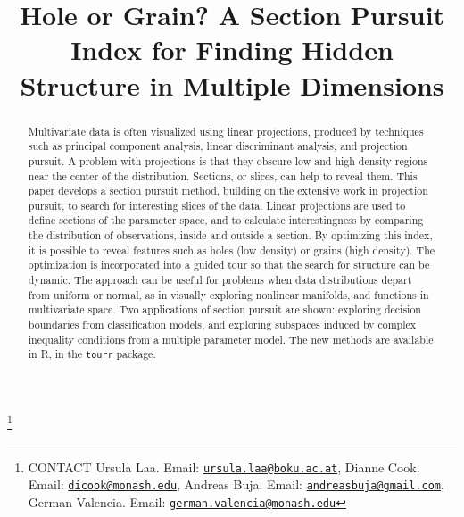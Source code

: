 \documentclass[]{interact}
\theoremstyle{plain}%
\theoremstyle{definition}
\theoremstyle{remark}
\begin{document}
\articletype{}

\title{Hole or Grain? A Section Pursuit Index for Finding Hidden
Structure in Multiple Dimensions}


\author{
}

\thanks{CONTACT Ursula
Laa. Email: \href{mailto:ursula.laa@boku.ac.at}{\nolinkurl{ursula.laa@boku.ac.at}}, Dianne
Cook. Email: \href{mailto:dicook@monash.edu}{\nolinkurl{dicook@monash.edu}}, Andreas
Buja. Email: \href{mailto:andreasbuja@gmail.com}{\nolinkurl{andreasbuja@gmail.com}}, German
Valencia. Email: \href{mailto:german.valencia@monash.edu}{\nolinkurl{german.valencia@monash.edu}}}

\maketitle

\begin{abstract}
Multivariate data is often visualized using linear projections, produced
by techniques such as principal component analysis, linear discriminant
analysis, and projection pursuit. A problem with projections is that
they obscure low and high density regions near the center of the
distribution. Sections, or slices, can help to reveal them. This paper
develops a section pursuit method, building on the extensive work in
projection pursuit, to search for interesting slices of the data. Linear
projections are used to define sections of the parameter space, and to
calculate interestingness by comparing the distribution of observations,
inside and outside a section. By optimizing this index, it is possible
to reveal features such as holes (low density) or grains (high density).
The optimization is incorporated into a guided tour so that the search
for structure can be dynamic. The approach can be useful for problems
when data distributions depart from uniform or normal, as in visually
exploring nonlinear manifolds, and functions in multivariate space. Two
applications of section pursuit are shown: exploring decision boundaries
from classification models, and exploring subspaces induced by complex
inequality conditions from a multiple parameter model. The new methods
are available in R, in the \texttt{tourr} package.
\end{abstract}
\end{document}
